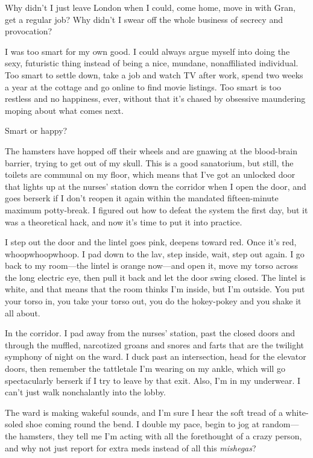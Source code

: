 Why didn’t I just leave London when I could, come home, move in
with Gran, get a regular job? Why didn’t I swear off the whole
business of secrecy and provocation?

I was too smart for my own good. I could always argue myself into
doing the sexy, futuristic thing instead of being a nice, mundane,
nonaffiliated individual. Too smart to settle down, take a job and
watch TV after work, spend two weeks a year at the cottage and go
online to find movie listings. Too smart is too restless and no
happiness, ever, without that it’s chased by obsessive maundering
moping about what comes next.

Smart or happy?

The hamsters have hopped off their wheels and are gnawing at the
blood-brain barrier, trying to get out of my skull. This is a good
sanatorium, but still, the toilets are communal on my floor, which
means that I’ve got an unlocked door that lights up at the nurses’
station down the corridor when I open the door, and goes berserk if
I don’t reopen it again within the mandated fifteen-minute maximum
potty-break. I figured out how to defeat the system the first day,
but it was a theoretical hack, and now it’s time to put it into
practice.

I step out the door and the lintel goes pink, deepens toward red.
Once it’s red, whoopwhoopwhoop. I pad down to the lav, step inside,
wait, step out again. I go back to my room—the lintel is orange
now—and open it, move my torso across the long electric eye, then
pull it back and let the door swing closed. The lintel is white,
and that means that the room thinks I’m inside, but I’m outside.
You put your torso in, you take your torso out, you do the
hokey-pokey and you shake it all about.

In the corridor. I pad away from the nurses’ station, past the
closed doors and through the muffled, narcotized groans and snores
and farts that are the twilight symphony of night on the ward. I
duck past an intersection, head for the elevator doors, then
remember the tattletale I’m wearing on my ankle, which will go
spectacularly berserk if I try to leave by that exit. Also, I’m in
my underwear. I can’t just walk nonchalantly into the lobby.

The ward is making wakeful sounds, and I’m sure I hear the soft
tread of a white-soled shoe coming round the bend. I double my
pace, begin to jog at random—the hamsters, they tell me I’m acting
with all the forethought of a crazy person, and why not just report
for extra meds instead of all this \emph{mishegas}?

